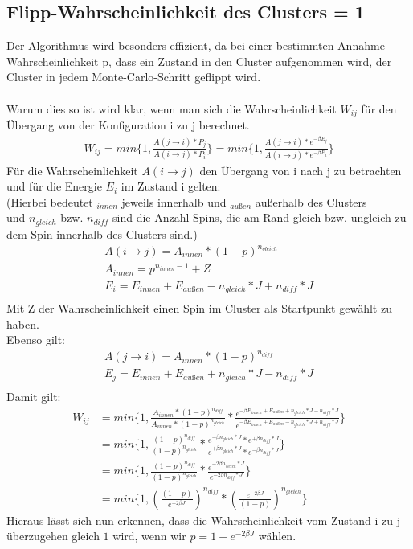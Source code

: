 \subsection{Flipp-Wahrscheinlichkeit des Clusters = 1}
Der Algorithmus wird besonders effizient, da bei einer bestimmten Annahme-Wahrscheinlichkeit p, dass ein Zustand in den Cluster aufgenommen wird, der Cluster in jedem Monte-Carlo-Schritt geflippt wird.\\\\
Warum dies so ist wird klar, wenn man sich die Wahrscheinlichkeit $W_{ij}$ für den Übergang von der Konfiguration i zu j berechnet.
\begin{align}
W_{ij} = min\{1, \frac{A(j \rightarrow i) * P_j}{A(i \rightarrow j) * P_i} \} = min\{1, \frac{A(j \rightarrow i) * e^{-\beta E_j}}{A(i \rightarrow j) * e^{-\beta E_i}} \}
\end{align}
Für die Wahrscheinlichkeit $A(i \rightarrow j)$ den Übergang von i nach j zu betrachten und für die Energie $E_i$ im Zustand i gelten:\\
(Hierbei bedeutet $_{innen}$ jeweils innerhalb und $_{außen}$ außerhalb des Clusters\\
und $n_{gleich}$ bzw. $n_{diff}$ sind die Anzahl Spins, die am Rand gleich bzw. ungleich zu dem Spin innerhalb des Clusters sind.)
\begin{align}
A(i \rightarrow j)=A_{innen} * (1 - p)^{n_{gleich}}\\
A_{innen} = p^{n_{innen}-1} + Z\\
E_i = E_{innen} + E_{außen} - n_{gleich} * J + n_{diff} * J\\
\end{align}
Mit Z der Wahrscheinlichkeit einen Spin im Cluster als Startpunkt gewählt zu haben.\\
Ebenso gilt:
\begin{align}
A(j \rightarrow i)=A_{innen} * (1 - p)^{n_{diff}}\\
E_j = E_{innen} + E_{außen} + n_{gleich} * J - n_{diff} * J\\
\end{align}
Damit gilt:
\begin{align}
W_{ij} &= min\{1, \frac{A_{innen}*(1-p)^{n_{diff}}}{A_{innen}*(1-p)^{n_{gleich}}} * \frac{e^{-\beta E_{innen} + E_{außen} + n_{gleich} * J - n_{diff} * J}}{e^{-\beta E_{innen} + E_{außen} - n_{gleich} * J + n_{diff} * J}}\} \\
&= min\{1, \frac{(1-p)^{n_{diff}}}{(1-p)^{n_{gleich}}} * \frac{e^{-\beta n_{gleich} * J} * e^{+\beta n_{diff} * J}}{e^{+\beta n_{gleich} * J} * e^{-\beta n_{diff} * J}}\}\\
&= min\{1, \frac{(1-p)^{n_{diff}}}{(1-p)^{n_{gleich}}} * \frac{e^{-2\beta n_{gleich} * J}}{e^{-2\beta n_{diff} * J}}\}\\
&= min\{1, \left(\frac{(1-p)}{e^{-2\beta J}}\right)^{n_{diff}} * \left(\frac{e^{-2\beta J}}{(1-p)}\right)^{n_{gleich}}\}
\end{align}
Hieraus lässt sich nun erkennen, dass die Wahrscheinlichkeit vom Zustand i zu j überzugehen gleich $1$ wird, wenn wir $p = 1 - e^{-2\beta J}$ wählen.

